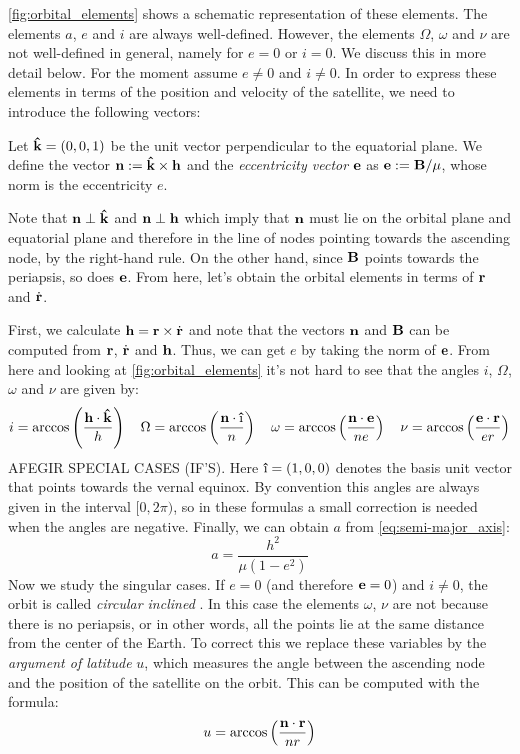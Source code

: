 \documentclass[../main.tex]{subfiles}
\begin{document}
\cref{fig:orbital_elements} shows a schematic representation of these elements. The elements $a$, $e$ and $i$ are always well-defined. However, the elements $\Omega$, $\omega$ and $\nu$ are not well-defined in general, namely for $e=0$ or $i=0$. We discuss this in more detail below. For the moment assume $e\neq 0$ and $i\neq 0$. In order to express these elements in terms of the position and velocity of the satellite, we need to introduce the following vectors:
\begin{definition}
  Let $\boldsymbol{\mathrm{\hat{k}}}=(0,0,1)$ be the unit vector perpendicular to the equatorial plane. We define the vector $\boldsymbol{\mathrm{n}}:=\boldsymbol{\mathrm{\hat{k}}}\times \boldsymbol{\mathrm{h}}$ and the \emph{eccentricity vector} $\boldsymbol{\mathrm{e}}$ as $\boldsymbol{\mathrm{e}}:=\boldsymbol{\mathrm{B}}/\mu$, whose norm is the eccentricity $e$.
\end{definition}
Note that $\boldsymbol{\mathrm{n}}\perp \boldsymbol{\mathrm{\hat{k}}}$ and $\boldsymbol{\mathrm{n}}\perp \boldsymbol{\mathrm{h}}$ which imply that $\boldsymbol{\mathrm{n}}$ must lie on the orbital plane and equatorial plane and therefore in the line of nodes pointing towards the ascending node, by the right-hand rule. On the other hand, since $\boldsymbol{\mathrm{B}}$ points towards the periapsis, so does $\boldsymbol{\mathrm{e}}$. From here, let's obtain the orbital elements in terms of $\boldsymbol{\mathrm{r}}$ and $\dot{\boldsymbol{\mathrm{r}}}$.

First, we calculate $\boldsymbol{\mathrm{h}}=\boldsymbol{\mathrm{r}}\times\dot{\boldsymbol{\mathrm{r}}}$ and note that the vectors $\boldsymbol{\mathrm{n}}$ and $\boldsymbol{\mathrm{B}}$ can be computed from $\boldsymbol{\mathrm{r}}$, $\dot{\boldsymbol{\mathrm{r}}}$ and $\boldsymbol{\mathrm{h}}$. Thus, we can get $e$ by taking the norm of $\boldsymbol{\mathrm{e}}$. From here and looking at \cref{fig:orbital_elements} it's not hard to see that the angles $i$, $\Omega$, $\omega$ and $\nu$ are given by:
\begin{equation}
  i=\arccos\left(\frac{\vf{h}\cdot \vf{\hat{k}}}{h}\right)\quad \Omega=\arccos\left(\frac{\vf{n}\cdot \vf{\hat{\text\i}}}{n}\right)\quad \omega=\arccos\left(\frac{\vf{n}\cdot \vf{e}}{ne}\right)\quad \nu=\arccos\left(\frac{\vf{e}\cdot \vf{r}}{er}\right)
\end{equation}
AFEGIR SPECIAL CASES (IF'S).
Here $\vf{\hat{\text\i}}=(1,0,0)$ denotes the basis unit vector that points towards the vernal equinox. By convention this angles are always given in the interval $[0,2\pi)$, so in these formulas a small correction is needed when the angles are negative. Finally, we can obtain $a$ from \cref{eq:semi-major_axis}:
\begin{equation}
  a = \frac{h^2}{\mu(1-e^2)}
\end{equation}
Now we study the singular cases. If $e=0$ (and therefore $\boldsymbol{\mathrm{e}}=0$) and $i\ne 0$, the orbit is called \emph{circular inclined} \cite{vallado}. In this case the elements $\omega$, $\nu$ are not because there is no periapsis, or in other words, all the points lie at the same distance from the center of the Earth. To correct this we replace these variables by the \emph{argument of latitude} $u$, which measures the angle between the ascending node and the position of the satellite on the orbit. This can be computed with the formula:
\begin{equation}
  u=\arccos\left(\frac{\boldsymbol{\mathrm{n}}\cdot \boldsymbol{\mathrm{r}}}{nr}\right)
\end{equation}
\end{document}
